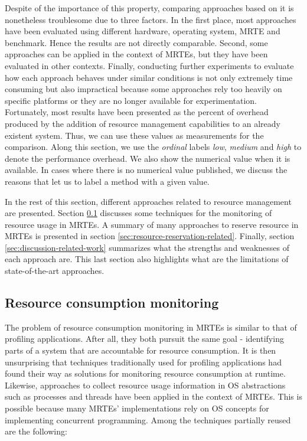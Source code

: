 \begin{itemize}
Despite of the importance of this property, comparing approaches based on it is nonetheless troublesome due to three factors.
In the first place, most approaches have been evaluated using different hardware, operating system, MRTE and benchmark.
Hence the results are not directly comparable.  
Second, some approaches can be applied in the context of MRTEs, but they have been evaluated in other contexts.
Finally, conducting further experiments to evaluate how each approach behaves under similar conditions is not only extremely time consuming but also impractical because some approaches rely too heavily on specific platforms or they are no longer available for experimentation.
Fortunately, most results have been presented as the percent of overhead produced by the addition of resource management capabilities to an already existent system.
Thus, we can use these values as measurements for the comparison.
Along this section, we use the \textit{ordinal} labels \textit{low}, \textit{medium} and \textit{high} to denote the performance overhead.
We also show the numerical value when it is available.
In cases where there is no numerical value published, we discuss the reasons that let us to label a method with a given value.
\end{itemize}

In the rest of this section, different approaches related to resource management are presented.
Section \ref{sec:resource-consumption-monitoring-related} discusses some techniques for the monitoring of resource usage in MRTEs.
A summary of many approaches to reserve resource in MRTEs is presented in section \ref{sec:resource-reservation-related}.
Finally, section \ref{sec:discussion-related-work} summarizes what the strengths and weaknesses of each approach are.
This last section also highlights what are the limitations of state-of-the-art approaches.

\subsection{Resource consumption monitoring} \label{sec:resource-consumption-monitoring-related}

The problem of resource consumption monitoring in MRTEs is similar to that of profiling applications.
After all, they both pursuit the same goal - identifying parts of a system that are accountable for resource consumption.
It is then unsurprising that techniques traditionally used for profiling applications had found their way as solutions for monitoring resource consumption at runtime.
Likewise, approaches to collect resource usage information in OS abstractions such as processes and threads have been applied in the context of MRTEs.
This is possible because many MRTEs' implementations rely on OS concepts for implementing concurrent programming.
Among the techniques partially reused are the following:

